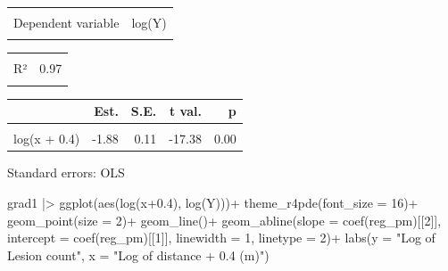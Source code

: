 \documentclass[
  letterpaper,
]{book}
\newenvironment{Shaded}{\begin{snugshade}}{\end{snugshade}}
\newcommand{\AttributeTok}[1]{\textcolor[rgb]{0.40,0.45,0.13}{#1}}
\newcommand{\DecValTok}[1]{\textcolor[rgb]{0.68,0.00,0.00}{#1}}
\newcommand{\FloatTok}[1]{\textcolor[rgb]{0.68,0.00,0.00}{#1}}
\newcommand{\FunctionTok}[1]{\textcolor[rgb]{0.28,0.35,0.67}{#1}}
\newcommand{\NormalTok}[1]{\textcolor[rgb]{0.00,0.23,0.31}{#1}}
\newcommand{\SpecialCharTok}[1]{\textcolor[rgb]{0.37,0.37,0.37}{#1}}
\newcommand{\StringTok}[1]{\textcolor[rgb]{0.13,0.47,0.30}{#1}}
\begin{document}
\begin{table}[!h]
\centering
\begin{tabular}{lr}
\toprule
\cellcolor{gray!6}{Observations} & \cellcolor{gray!6}{10}\\
Dependent variable & log(Y)\\
\cellcolor{gray!6}{Type} & \cellcolor{gray!6}{OLS linear regression}\\
\bottomrule
\end{tabular}
\end{table} \begin{table}[!h]
\centering
\begin{tabular}{lr}
\toprule
\cellcolor{gray!6}{F(1,8)} & \cellcolor{gray!6}{302.16}\\
R² & 0.97\\
\cellcolor{gray!6}{Adj. R²} & \cellcolor{gray!6}{0.97}\\
\bottomrule
\end{tabular}
\end{table} \begin{table}[!h]
\centering
\begin{threeparttable}
\begin{tabular}{lrrrr}
\toprule
  & Est. & S.E. & t val. & p\\
\midrule
\cellcolor{gray!6}{(Intercept)} & \cellcolor{gray!6}{6.10} & \cellcolor{gray!6}{0.23} & \cellcolor{gray!6}{26.73} & \cellcolor{gray!6}{0.00}\\
log(x + 0.4) & -1.88 & 0.11 & -17.38 & 0.00\\
\bottomrule
\end{tabular}
\begin{tablenotes}
\item Standard errors: OLS
\end{tablenotes}
\end{threeparttable}
\end{table}

\begin{Shaded}
\begin{Highlighting}[]
\NormalTok{grad1 }\SpecialCharTok{|\textgreater{}} 
  \FunctionTok{ggplot}\NormalTok{(}\FunctionTok{aes}\NormalTok{(}\FunctionTok{log}\NormalTok{(x}\FloatTok{+0.4}\NormalTok{), }\FunctionTok{log}\NormalTok{(Y)))}\SpecialCharTok{+}
  \FunctionTok{theme\_r4pde}\NormalTok{(}\AttributeTok{font\_size =} \DecValTok{16}\NormalTok{)}\SpecialCharTok{+}
  \FunctionTok{geom\_point}\NormalTok{(}\AttributeTok{size =} \DecValTok{2}\NormalTok{)}\SpecialCharTok{+}
  \FunctionTok{geom\_line}\NormalTok{()}\SpecialCharTok{+}
  \FunctionTok{geom\_abline}\NormalTok{(}\AttributeTok{slope =} \FunctionTok{coef}\NormalTok{(reg\_pm)[[}\DecValTok{2}\NormalTok{]], }\AttributeTok{intercept =} \FunctionTok{coef}\NormalTok{(reg\_pm)[[}\DecValTok{1}\NormalTok{]],}
              \AttributeTok{linewidth =} \DecValTok{1}\NormalTok{, }\AttributeTok{linetype =} \DecValTok{2}\NormalTok{)}\SpecialCharTok{+}
 \FunctionTok{labs}\NormalTok{(}\AttributeTok{y =} \StringTok{"Log of Lesion count"}\NormalTok{,}
       \AttributeTok{x =} \StringTok{"Log of distance + 0.4 (m)"}\NormalTok{)}
\end{Highlighting}
\end{Shaded}
\end{document}
